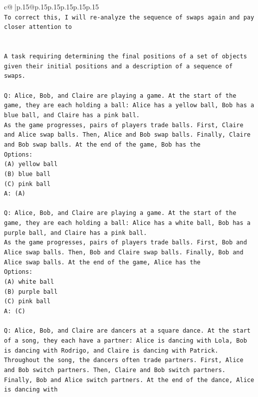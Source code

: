 \documentclass{article}
\begin{document}
{\begin{supertabular}{c@{$\;$}|p{.15\linewidth}@{}p{.15\linewidth}p{.15\linewidth}p{.15\linewidth}p{.15\linewidth}p{.15\linewidth}}
{{{\\ 
\texttt{To correct this, I will re{-}analyze the sequence of swaps again and pay closer attention to} \\
\\ 
\\ 
\texttt{A task requiring determining the final positions of a set of objects given their initial positions and a description of a sequence of swaps.} \\
\\ 
\texttt{Q: Alice, Bob, and Claire are playing a game. At the start of the game, they are each holding a ball: Alice has a yellow ball, Bob has a blue ball, and Claire has a pink ball.} \\
\texttt{As the game progresses, pairs of players trade balls. First, Claire and Alice swap balls. Then, Alice and Bob swap balls. Finally, Claire and Bob swap balls. At the end of the game, Bob has the} \\
\texttt{Options:} \\
\texttt{(A) yellow ball} \\
\texttt{(B) blue ball} \\
\texttt{(C) pink ball} \\
\texttt{A: (A)} \\
\\ 
\texttt{Q: Alice, Bob, and Claire are playing a game. At the start of the game, they are each holding a ball: Alice has a white ball, Bob has a purple ball, and Claire has a pink ball.} \\
\texttt{As the game progresses, pairs of players trade balls. First, Bob and Alice swap balls. Then, Bob and Claire swap balls. Finally, Bob and Alice swap balls. At the end of the game, Alice has the} \\
\texttt{Options:} \\
\texttt{(A) white ball} \\
\texttt{(B) purple ball} \\
\texttt{(C) pink ball} \\
\texttt{A: (C)} \\
\\ 
\texttt{Q: Alice, Bob, and Claire are dancers at a square dance. At the start of a song, they each have a partner: Alice is dancing with Lola, Bob is dancing with Rodrigo, and Claire is dancing with Patrick.} \\
\texttt{Throughout the song, the dancers often trade partners. First, Alice and Bob switch partners. Then, Claire and Bob switch partners. Finally, Bob and Alice switch partners. At the end of the dance, Alice is dancing with} \\
}}}
\end{supertabular}}
\end{document}
